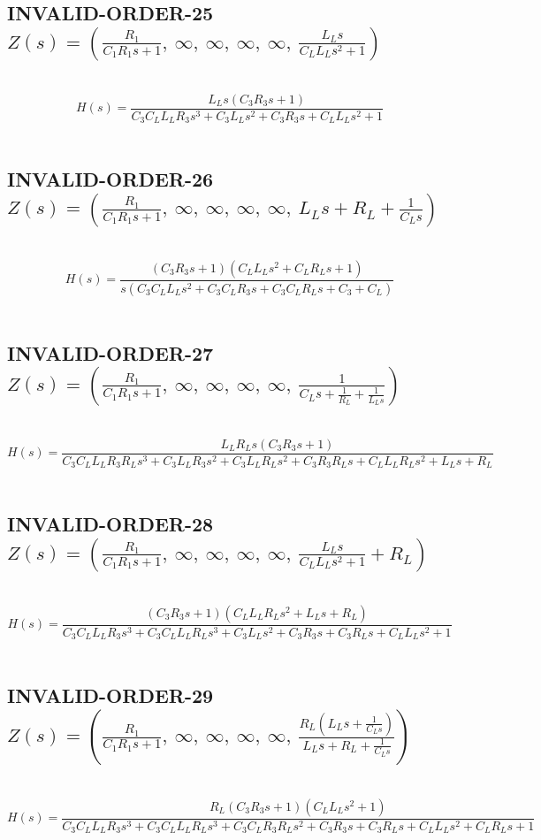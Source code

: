 \documentclass{article}
\begin{document}
\subsection{INVALID-ORDER-25 $Z(s) = \left( \frac{R_{1}}{C_{1} R_{1} s + 1}, \  \infty, \  \infty, \  \infty, \  \infty, \  \frac{L_{L} s}{C_{L} L_{L} s^{2} + 1}\right)$ } \ 
\textbf{\[H(s) = \frac{L_{L} s \left(C_{3} R_{3} s + 1\right)}{C_{3} C_{L} L_{L} R_{3} s^{3} + C_{3} L_{L} s^{2} + C_{3} R_{3} s + C_{L} L_{L} s^{2} + 1}\] } \ 
\subsection{INVALID-ORDER-26 $Z(s) = \left( \frac{R_{1}}{C_{1} R_{1} s + 1}, \  \infty, \  \infty, \  \infty, \  \infty, \  L_{L} s + R_{L} + \frac{1}{C_{L} s}\right)$ } \ 
\textbf{\[H(s) = \frac{\left(C_{3} R_{3} s + 1\right) \left(C_{L} L_{L} s^{2} + C_{L} R_{L} s + 1\right)}{s \left(C_{3} C_{L} L_{L} s^{2} + C_{3} C_{L} R_{3} s + C_{3} C_{L} R_{L} s + C_{3} + C_{L}\right)}\] } \ 
\subsection{INVALID-ORDER-27 $Z(s) = \left( \frac{R_{1}}{C_{1} R_{1} s + 1}, \  \infty, \  \infty, \  \infty, \  \infty, \  \frac{1}{C_{L} s + \frac{1}{R_{L}} + \frac{1}{L_{L} s}}\right)$ } \ 
\textbf{\[H(s) = \frac{L_{L} R_{L} s \left(C_{3} R_{3} s + 1\right)}{C_{3} C_{L} L_{L} R_{3} R_{L} s^{3} + C_{3} L_{L} R_{3} s^{2} + C_{3} L_{L} R_{L} s^{2} + C_{3} R_{3} R_{L} s + C_{L} L_{L} R_{L} s^{2} + L_{L} s + R_{L}}\] } \ 
\subsection{INVALID-ORDER-28 $Z(s) = \left( \frac{R_{1}}{C_{1} R_{1} s + 1}, \  \infty, \  \infty, \  \infty, \  \infty, \  \frac{L_{L} s}{C_{L} L_{L} s^{2} + 1} + R_{L}\right)$ } \ 
\textbf{\[H(s) = \frac{\left(C_{3} R_{3} s + 1\right) \left(C_{L} L_{L} R_{L} s^{2} + L_{L} s + R_{L}\right)}{C_{3} C_{L} L_{L} R_{3} s^{3} + C_{3} C_{L} L_{L} R_{L} s^{3} + C_{3} L_{L} s^{2} + C_{3} R_{3} s + C_{3} R_{L} s + C_{L} L_{L} s^{2} + 1}\] } \ 
\subsection{INVALID-ORDER-29 $Z(s) = \left( \frac{R_{1}}{C_{1} R_{1} s + 1}, \  \infty, \  \infty, \  \infty, \  \infty, \  \frac{R_{L} \left(L_{L} s + \frac{1}{C_{L} s}\right)}{L_{L} s + R_{L} + \frac{1}{C_{L} s}}\right)$ } \ 
\textbf{\[H(s) = \frac{R_{L} \left(C_{3} R_{3} s + 1\right) \left(C_{L} L_{L} s^{2} + 1\right)}{C_{3} C_{L} L_{L} R_{3} s^{3} + C_{3} C_{L} L_{L} R_{L} s^{3} + C_{3} C_{L} R_{3} R_{L} s^{2} + C_{3} R_{3} s + C_{3} R_{L} s + C_{L} L_{L} s^{2} + C_{L} R_{L} s + 1}\] } \ 
\end{document}
